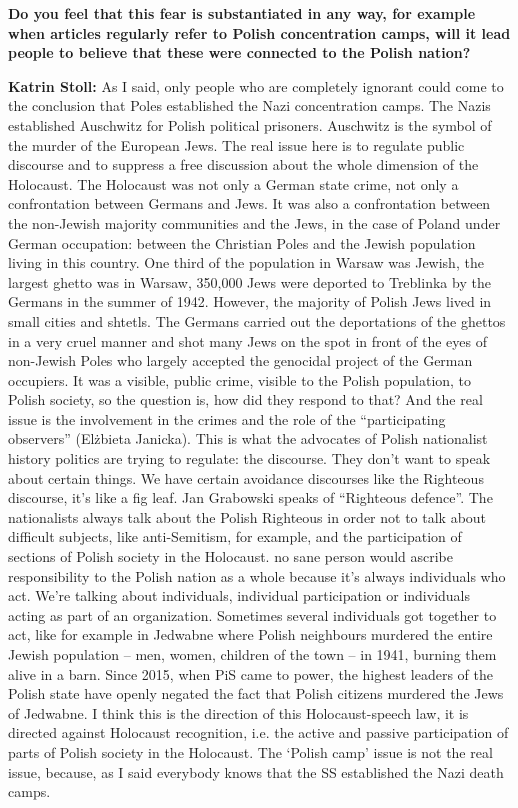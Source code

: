 \textbf{Do you feel that this fear is substantiated in any way, for example when articles regularly refer to Polish concentration camps, will it lead people to believe that these were connected to the Polish nation?}

\textbf{Katrin Stoll:} As I said, only people who are completely ignorant could come to the conclusion that Poles established the Nazi concentration camps. The Nazis established Auschwitz for Polish political prisoners. Auschwitz is the symbol of the murder of the European Jews. The real issue here is to regulate public discourse and to suppress a free discussion about the whole dimension of the Holocaust. The Holocaust was not only a German state crime, not only a confrontation between Germans and Jews. It was also a confrontation between the non-Jewish majority communities and the Jews, in the case of Poland under German occupation: between the Christian Poles and the Jewish population living in this country. One third of the population in Warsaw was Jewish, the largest ghetto was in Warsaw, 350,000 Jews were deported to Treblinka by the Germans in the summer of 1942. However, the majority of Polish Jews lived in small cities and shtetls. The Germans carried out the deportations of the ghettos in a very cruel manner and shot many Jews on the spot in front of the eyes of non-Jewish Poles who largely accepted the genocidal project of the German occupiers. It was a visible, public crime, visible to the Polish population, to Polish society, so the question is, how did they respond to that?  And the real issue is the involvement in the crimes and the role of the "`participating observers"' (Elżbieta Janicka). This is what the advocates of Polish nationalist history politics are trying to regulate: the discourse. They don’t want to speak about certain things. We have certain avoidance discourses like the Righteous discourse, it’s like a fig leaf. Jan Grabowski speaks of "`Righteous defence"'. The nationalists always talk about the Polish Righteous in order not to talk about difficult subjects, like anti-Semitism, for example, and the participation of sections of Polish society in the Holocaust. no sane person would ascribe responsibility to the Polish nation as a whole because it’s always individuals who act. We’re talking about individuals, individual participation or individuals acting as part of an organization. Sometimes several individuals got together to act, like for example in Jedwabne where Polish neighbours murdered the entire Jewish population – men, women, children of the town – in 1941, burning them alive in a barn. Since 2015, when PiS came to power, the highest leaders of the Polish state have openly negated the fact that Polish citizens murdered the Jews of Jedwabne. I think this is the direction of this Holocaust-speech law, it is directed against Holocaust recognition, i.e. the active and passive participation of parts of Polish society in the Holocaust. The ‘Polish camp’ issue is not the real issue, because, as I said everybody knows that the SS established the Nazi death camps. 

